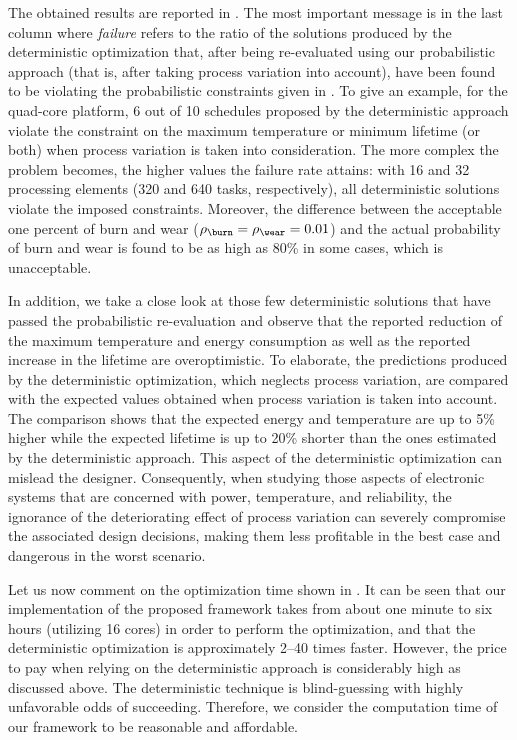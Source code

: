 The obtained results are reported in . The
most important message is in the last column where \emph{failure} refers to the
ratio of the solutions produced by the deterministic optimization that, after
being re-evaluated using our probabilistic approach (that is, after taking
process variation into account), have been found to be violating the
probabilistic constraints given in . To
give an example, for the quad-core platform, 6 out of 10 schedules proposed by
the deterministic approach violate the constraint on the maximum temperature or
minimum lifetime (or both) when process variation is taken into consideration.
The more complex the problem becomes, the higher values the failure rate
attains: with 16 and 32 processing elements (320 and 640 tasks, respectively),
all deterministic solutions violate the imposed constraints. Moreover, the
difference between the acceptable one percent of burn and wear ($\rho_\burn =
\rho_\wear = 0.01$) and the actual probability of burn and wear is found to be
as high as 80\% in some cases, which is unacceptable.

In addition, we take a close look at those few deterministic solutions that have
passed the probabilistic re-evaluation and observe that the reported reduction
of the maximum temperature and energy consumption as well as the reported
increase in the lifetime are overoptimistic. To elaborate, the predictions
produced by the deterministic optimization, which neglects process variation,
are compared with the expected values obtained when process variation is taken
into account. The comparison shows that the expected energy and temperature are
up to 5\% higher while the expected lifetime is up to 20\% shorter than the ones
estimated by the deterministic approach. This aspect of the deterministic
optimization can mislead the designer. Consequently, when studying those aspects
of electronic systems that are concerned with power, temperature, and
reliability, the ignorance of the deteriorating effect of process variation can
severely compromise the associated design decisions, making them less profitable
in the best case and dangerous in the worst scenario.

Let us now comment on the optimization time shown in
. It can be seen that our implementation of
the proposed framework takes from about one minute to six hours (utilizing 16
cores) in order to perform the optimization, and that the deterministic
optimization is approximately 2--40 times faster. However, the price to pay when
relying on the deterministic approach is considerably high as discussed above.
The deterministic technique is blind-guessing with highly unfavorable odds of
succeeding. Therefore, we consider the computation time of our framework to be
reasonable and affordable.

